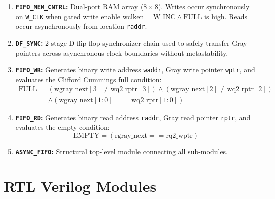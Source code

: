 \documentclass[12pt,a4paper]{article}
\begin{document}
\begin{enumerate}
    \item \textbf{\texttt{FIFO\_MEM\_CNTRL}:} Dual-port RAM array ($8 \times 8$). Writes occur synchronously on \texttt{W\_CLK} when gated write enable $\text{wclken} = \text{W\_INC} \land \overline{\text{FULL}}$ is high. Reads occur asynchronously from location \texttt{raddr}.
    \item \textbf{\texttt{DF\_SYNC}:} 2-stage D flip-flop synchronizer chain used to safely transfer Gray pointers across asynchronous clock boundaries without metastability.
    \item \textbf{\texttt{FIFO\_WR}:} Generates binary write address \texttt{waddr}, Gray write pointer \texttt{wptr}, and evaluates the Clifford Cummings full condition:
    \begin{align*}
        \text{FULL} = & (\text{wgray\_next}[3] \neq \text{wq2\_rptr}[3]) \land (\text{wgray\_next}[2] \neq \text{wq2\_rptr}[2]) \\
                      & \land (\text{wgray\_next}[1:0] == \text{wq2\_rptr}[1:0])
    \end{align*}
    \item \textbf{\texttt{FIFO\_RD}:} Generates binary read address \texttt{raddr}, Gray read pointer \texttt{rptr}, and evaluates the empty condition:
    \[
        \text{EMPTY} = (\text{rgray\_next} == \text{rq2\_wptr})
    \]
    \item \textbf{\texttt{ASYNC\_FIFO}:} Structural top-level module connecting all sub-modules.
\end{enumerate}

\section{RTL Verilog Modules}






\end{document}
